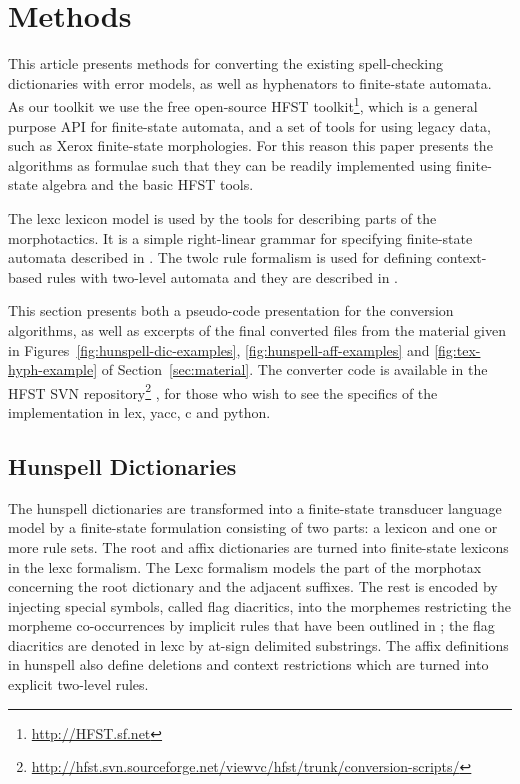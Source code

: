 \documentclass[postprint]{flammie}
\begin{document}
\section{Methods}
\label{sec:methods}

This article presents methods for converting the existing spell-checking
dictionaries with error models, as well as hyphenators to finite-state
automata. As our toolkit we use the free open-source HFST
toolkit\footnote{\url{http://HFST.sf.net}}, which is a general purpose API for
finite-state automata, and a set of tools for using legacy data, such as Xerox
finite-state morphologies. For this reason this paper presents the algorithms
as formulae such that they can be readily implemented using finite-state
algebra and the basic HFST tools.

The lexc lexicon model is used by the tools for describing parts of the
morphotactics. It is a simple right-linear grammar for specifying finite-state
automata described in \cite{beesley/2003,conf/sfcm/Linden2009}. The twolc rule
formalism is used for defining context-based rules with two-level automata and
they are described in \cite{koskenniemi/1983,conf/sfcm/Linden2009}.

This section presents both a pseudo-code presentation for the conversion
algorithms, as well as excerpts of the final converted files from the material
given in Figures~\ref{fig:hunspell-dic-examples},
\ref{fig:hunspell-aff-examples} and \ref{fig:tex-hyph-example} of
Section~\ref{sec:material}.  The converter code is available in the HFST SVN
repository\footnote{\url{http://hfst.svn.sourceforge.net/viewvc/hfst/trunk/conversion-scripts/}}
, for those who wish to see the specifics of the implementation in
lex, yacc, c and python.

\subsection{Hunspell Dictionaries}

The hunspell dictionaries are transformed into a finite-state transducer
language model by a finite-state formulation consisting of two parts: a lexicon
and one or more rule sets. The root and affix dictionaries are turned into
finite-state lexicons in the lexc formalism. The Lexc formalism models the part
of the morphotax concerning the root dictionary and the adjacent suffixes. The
rest is encoded by injecting special symbols, called flag diacritics, into the
morphemes restricting the morpheme co-occurrences by implicit rules that have
been outlined in \cite{beesley/1998}; the flag diacritics are denoted in lexc
by at-sign delimited substrings. The affix definitions in hunspell also define
deletions and context restrictions which are turned into explicit two-level
rules.
\end{document}
